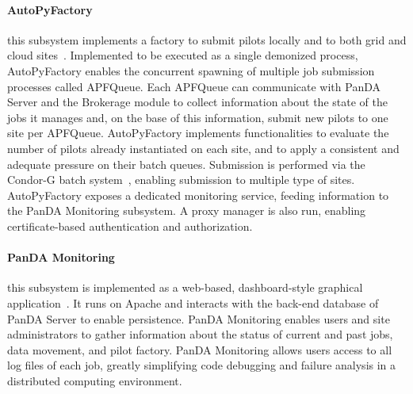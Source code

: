 \paragraph{\textbf{AutoPyFactory}} this subsystem implements a factory to submit
pilots locally and to both grid and cloud
sites~\cite{caballero2012autopyfactory}. Implemented to be executed as a single
demonized process, AutoPyFactory enables the concurrent spawning of multiple job
submission processes called APFQueue. Each APFQueue can communicate with PanDA
Server and the Brokerage module to collect information about the state of the
jobs it manages and, on the base of this information, submit new pilots to one
site per APFQueue. AutoPyFactory implements functionalities to evaluate the
number of pilots already instantiated on each site, and to apply a consistent
and adequate pressure on their batch queues. Submission is performed via the
Condor-G batch system~\cite{frey2002condor}, enabling submission to multiple
type of sites. AutoPyFactory exposes a dedicated monitoring service, feeding
information to the PanDA Monitoring subsystem. A proxy manager is also run,
enabling certificate-based authentication and authorization.


\paragraph{\textbf{PanDA Monitoring}} this subsystem is implemented as a
web-based, dashboard-style graphical application~\cite{klimentov2011atlas}. It
runs on Apache and interacts with the back-end database of PanDA Server to
enable persistence. PanDA Monitoring enables users and site administrators to
gather information about the status of current and past jobs, data movement, and
pilot factory. PanDA Monitoring allows users access to all log files of each
job, greatly simplifying code debugging and failure analysis in a distributed
computing environment.

